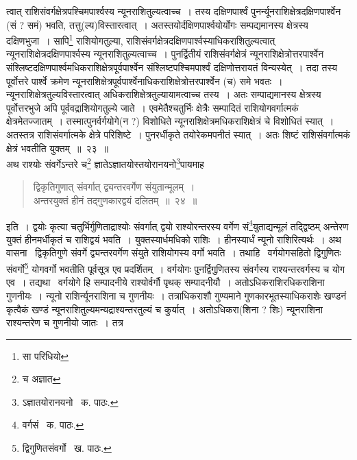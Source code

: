 \documentclass[11pt, openany]{book}
\begin{document}
\noindent त्वात् राशिसंवर्गक्षेत्रपश्चिमपार्श्वस्य न्यूनराशितुल्यत्वाच्च~। तस्य दक्षिणपार्श्वं पुनर्न्यूनराशिक्षेत्रदक्षिणपार्श्वेन (सं ? समं) भवति, तत्तु(ल्य)विस्तारत्वात्~। अतस्तयोर्दक्षिणपार्श्वयोर्योगः सम्पद्यमानस्य क्षेत्रस्य दक्षिणभुजा~। सापि\renewcommand{\thefootnote}{१}\footnote{सा परिधियो} राशियोगतुल्या, राशिसंवर्गक्षेत्रदक्षिणपार्श्वस्याधिकराशितुल्यत्वात् न्यूनराशिक्षेत्रदक्षिणपार्श्वस्य न्यूनराशितुल्यत्वाच्च~। पुनर्द्वितीयं राशिसंवर्गक्षेत्रं न्यूनराशिक्षेत्रोत्तरपार्श्वेन
संश्लिष्टदक्षिणपार्श्वमधिकराशिक्षेत्रपूर्वपार्श्वेन संश्लिष्टपश्चिमपार्श्वं दक्षिणोत्तरायतं विन्यस्येत्~। तदा तस्य पूर्वोत्तरे पार्श्वे क्रमेण न्यूनराशिक्षेत्रपूर्वपार्श्वेनाधिकराशिक्षेत्रोत्तरपार्श्वेन (च) समे भवतः~। न्यूनराशिक्षेत्रतुल्यविस्तारत्वात् अधिकराशिक्षेत्रतुल्यायामत्वाच्च तस्य~। अतः सम्पाद्यमानस्य क्षेत्रस्य पूर्वोत्तरभुजे अपि पूर्ववद्राशियोगतुल्ये जाते~। एवमेतैश्चतुर्भिः क्षेत्रैः सम्पादितं राशियोगवर्गात्मकं क्षेत्रमेतज्जातम्~।
तस्मात्पुनर्वर्गयोगे(न ?) विशोधिते न्यूनराशिक्षेत्रमधिकराशिक्षेत्रं चे विशोधितं स्यात्~। अतस्तत्र राशिसंवर्गात्मके क्षेत्रे परिशिष्टे~। पुनरर्धीकृते तयोरेकमपनीतं स्यात्~। अतः शिष्टं राशिसंवर्गात्मकं क्षेत्रं भवतीति युक्तम्~॥~२३~॥\\

अथ राश्योः संवर्गेऽन्तरे च\renewcommand{\thefootnote}{२}\footnote{च अज्ञात} ज्ञातेऽज्ञातयोस्तयोरानयनो\renewcommand{\thefootnote}{३}\footnote{ऽज्ञातयोरानयनो \textendash\ क. पाठः.}पायमाह\textendash 

\begin{quote}
{\ab द्विकृतिगुणात् संवर्गात् द्व्यन्तरवर्गेण संयुतान्मूलम्~।\\
अन्तरयुक्तं हीनं तद्गुणकारद्वयं दलितम्~॥~२४~॥}
\end{quote}

इति~। द्वयोः कृत्या चतुर्भिर्गुणिताद्राश्योः संवर्गात् द्वयो राश्योरन्तरस्य वर्गेण सं\renewcommand{\thefootnote}{४}\footnote{वर्गसं \textendash\ क. पाठः.}युताद्यन्मूलं तद्द्विष्ठम् अन्तेरण युक्तं हीनमर्धीकृतं च राशिद्वयं भवति~। युक्तस्यार्धमधिको राशिः~। हीनस्यार्धं न्यूनो राशिरित्यर्थः~। अथ वासना \textendash\ द्विकृतिगुणे संवर्गे द्व्यन्तरवर्गेण संयुते राशियोगस्य वर्गो भवति~। तथाहि \textendash\ वर्गयोगसहितो द्विगुणितः संवर्गो\renewcommand{\thefootnote}{५}\footnote{द्विगुणितसंवर्गो \textendash\ ख. पाठः.} योगवर्गो भवतीति पूर्वसूत्र एव प्रदर्शितम्~। वर्गयोगः पुनर्द्विगुणितस्य संवर्गस्य राश्यन्तरवर्गस्य च योग एव~। तद्यथा \textendash\ वर्गयोगे हि सम्पादनीये राश्योर्वर्गौ पृथक् सम्पादनीयौ~। अतोऽधिकराशिरधिकराशिना गुणनीयः~। न्यूनो राशिर्न्यूनराशिना च गुणनीयः~। तत्राधिकराशौ गुण्यमाने गुणकारभूतस्याधिकराशेः खण्डनं कृत्वैकं खण्डं न्यूनराशितुल्यमन्यद्राश्यन्तरतुल्यं च कुर्यात्~। अतोऽधिकरा(शिना ? शिः) न्यूनराशिना राश्यन्तरेण च गुणनीयो जातः~। तत्र
\end{document}
